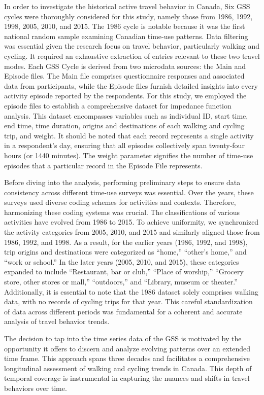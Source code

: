 \documentclass[
11pt, %
oneside, %
english, %
singlespacing, %
]{macthesis} %
\begin{document}
In order to investigate the historical active travel behavior in Canada, Six GSS cycles were thoroughly considered for this study, namely those from 1986, 1992, 1998, 2005, 2010, and 2015. The 1986 cycle is notable because it was the first national random sample examining Canadian time-use patterns. Data filtering was essential given the research focus on travel behavior, particularly walking and cycling. It required an exhaustive extraction of entries relevant to these two travel modes. Each GSS Cycle is derived from two microdata sources: the Main and Episode files. The Main file comprises questionnaire responses and associated data from participants, while the Episode files furnish detailed insights into every activity episode reported by the respondents. For this study, we employed the episode files to establish a comprehensive dataset for impedance function analysis. This dataset encompasses variables such as individual ID, start time, end time, time duration, origins and destinations of each walking and cycling trip, and weight. It should be noted that each record represents a single activity in a respondent's day, ensuring that all episodes collectively span twenty-four hours (or 1440 minutes). The weight parameter signifies the number of time-use episodes that a particular record in the Episode File represents.

Before diving into the analysis, performing preliminary steps to ensure data consistency across different time-use surveys was essential. Over the years, these surveys used diverse coding schemes for activities and contexts. Therefore, harmonizing these coding systems was crucial. The classifications of various activities have evolved from 1986 to 2015. To achieve uniformity, we synchronized the activity categories from 2005, 2010, and 2015 and similarly aligned those from 1986, 1992, and 1998. As a result, for the earlier years (1986, 1992, and 1998), trip origins and destinations were categorized as ``home,'' ``other's home,'' and ``work or school.'' In the later years (2005, 2010, and 2015), these categories expanded to include ``Restaurant, bar or club,'' ``Place of worship,'' ``Grocery store, other stores or mall,'' ``outdoors,'' and ``Library, museum or theater.'' Additionally, it is essential to note that the 1986 dataset solely comprises walking data, with no records of cycling trips for that year. This careful standardization of data across different periods was fundamental for a coherent and accurate analysis of travel behavior trends.

The decision to tap into the time series data of the GSS is motivated by the opportunity it offers to discern and analyze evolving patterns over an extended time frame. This approach spans three decades and facilitates a comprehensive longitudinal assessment of walking and cycling trends in Canada. This depth of temporal coverage is instrumental in capturing the nuances and shifts in travel behaviors over time.
\end{document}
